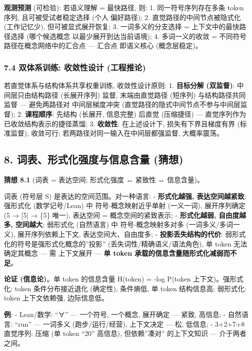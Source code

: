 \documentclass[
]{article}
\begin{document}
\textbf{观测预测} (可检验): 若语义理解 = 最快路径, 则: 1.
同一符号序列存在多条 token 序列, 且可被受试者稳定选择 (个人 偏好路径);
2. 直觉路径的中间节点被隐式化 (工作记忆少), 但可被显式展开恢复; 3.
一词多义的分支选择 = 上下文中的最快路径选择 (哪个候选概念
以最少展开到达当前语境); 4. 多词一义的收敛 =
不同符号路径在概念网络中的汇合点 --- 汇合点 即语义核心 (概念层稳定)。

\subsubsection{7.4 双体系训练: 收敛性设计
(工程推论)}\label{ux53ccux4f53ux7cfbux8badux7ec3-ux6536ux655bux6027ux8bbeux8ba1-ux5de5ux7a0bux63a8ux8bba}

若直觉体系与结构体系共享权重训练, 收敛性设计原则: 1. \textbf{目标分解
(双监督)}: 中间层只由结构路径 (长展开序列) 监督, 末端由直觉路径 (短序列)
与结构路径共同监督 --- 避免两路径对 中间层梯度冲突
(直觉路径的隐式中间节点不参与中间层监督); 2. \textbf{课程顺序}: 先结构
(长展开, 信息完整) 后直觉 (压缩捷径) ---
直觉序列作为已收敛结构表示的捷径蒸馏; 3. \textbf{收敛性}: 在上述设计下,
损失有下界且梯度有界 (标准监督), 收敛可行;
若两路径对同一输入在中间层都强监督, 大概率震荡。

\subsection{8. 词表、形式化强度与信息含量
(猜想)}\label{ux8bcdux8868ux5f62ux5f0fux5316ux5f3aux5ea6ux4e0eux4fe1ux606fux542bux91cf-ux731cux60f3}

\textbf{猜想 8.1} (词表 = 表达空间; 形式化强度 ↔ 紧致性 ↔ 信息含量)。

词表 (符号层 S) 是表达的空间范围。对一种语言: - \textbf{形式化越强,
表达空间越紧致}: 强形式化 (数学记号/Lean) 中 符号-概念映射近乎单射
(一义一词), 展开序列确定 (5 → {[}5{]} → \{5\} 唯一), 表达空间 =
概念空间的紧致表示; - \textbf{形式化越弱, 自由度越多, 空间越大}:
弱形式化 (自然语言) 中 符号-概念映射多对多 (一词多义/多词一义),
展开序列依赖上下文, 表达空间大、自由度多; - \textbf{投影丢失结构的代价}:
弱形式化的符号是强形式化概念的''投影'' (丢失词性/精确语义/语法角色), 单
token 无法确定其概念 --- 需 上下文展开 --- \textbf{单 token
承载的信息含量随形式化减弱而不足}。

\textbf{论证 (信息论)}。单 token 的信息含量 H(token) = -log P(token
\textbar{} 上下文)。强形式化: token 条件分布接近退化 (确定性), 条件熵低,
单 token 结构信息高; 弱形式化: token 上下文依赖强, 边际信息低。

\textbf{例}: - Lean/数学: ``∀'' --- 一个符号, 一个概念, 展开确定 ---
紧致, 高信息; - 自然语言: ``run'' --- 一词多义 (跑步/运行/经营),
上下文决定 --- 松, 低信息; - 3+2+7+8 直觉序列: 压缩 (单 token ``20''
高信息), 但依赖''凑对'' 的上下文知识 --- 介于两者之间。
\end{document}

